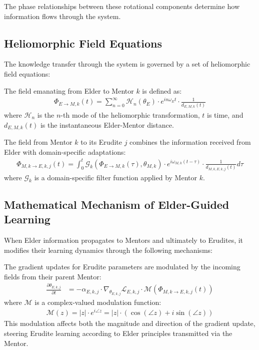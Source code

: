 The phase relationships between these rotational components determine how information flows through the system.

\subsection{Heliomorphic Field Equations}

The knowledge transfer through the system is governed by a set of heliomorphic field equations:

\begin{definition}
The field emanating from Elder to Mentor $k$ is defined as:
\begin{align}
\Phi_{E \rightarrow M,k}(t) = \sum_{n=0}^{\infty} \mathcal{H}_n(\theta_E) \cdot e^{in\omega_E t} \cdot \frac{1}{d_{E,M,k}(t)}
\end{align}
where $\mathcal{H}_n$ is the $n$-th mode of the heliomorphic transformation, $t$ is time, and $d_{E,M,k}(t)$ is the instantaneous Elder-Mentor distance.
\end{definition}

\begin{definition}
The field from Mentor $k$ to its Erudite $j$ combines the information received from Elder with domain-specific adaptations:
\begin{align}
\Phi_{M,k \rightarrow E,k,j}(t) = \int_0^t \mathcal{G}_k(\Phi_{E \rightarrow M,k}(\tau), \theta_{M,k}) \cdot e^{i\omega_{M,k}(t-\tau)} \cdot \frac{1}{d_{M,k,E,k,j}(t)} d\tau
\end{align}
where $\mathcal{G}_k$ is a domain-specific filter function applied by Mentor $k$.
\end{definition}

\subsection{Mathematical Mechanism of Elder-Guided Learning}

When Elder information propagates to Mentors and ultimately to Erudites, it modifies their learning dynamics through the following mechanisms:

\begin{theorem}
The gradient updates for Erudite parameters are modulated by the incoming fields from their parent Mentor:
\begin{align}
\frac{\partial \theta_{E,k,j}}{\partial t} &= -\alpha_{E,k,j} \cdot \nabla_{\theta_{E,k,j}} \mathcal{L}_{E,k,j} \cdot \mathcal{M}(\Phi_{M,k \rightarrow E,k,j}(t))
\end{align}
where $\mathcal{M}$ is a complex-valued modulation function:
\begin{align}
\mathcal{M}(z) = |z| \cdot e^{i\angle z} = |z| \cdot (\cos(\angle z) + i\sin(\angle z))
\end{align}
This modulation affects both the magnitude and direction of the gradient update, steering Erudite learning according to Elder principles transmitted via the Mentor.
\end{theorem}

